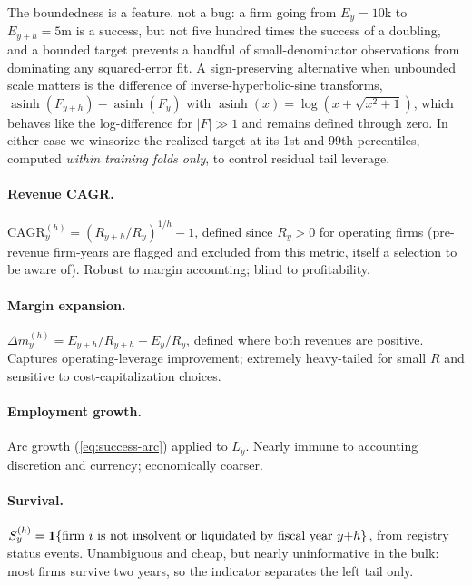 The boundedness is a feature, not a bug: a firm going from $E_y = 10$k to
$E_{y+h} = 5$m is a success, but not five hundred times the success of a doubling, and a
bounded target prevents a handful of small-denominator observations from dominating any
squared-error fit. A sign-preserving alternative when unbounded scale matters is the
difference of inverse-hyperbolic-sine transforms,
$\operatorname{asinh}(F_{y+h}) - \operatorname{asinh}(F_y)$ with
$\operatorname{asinh}(x) = \log(x + \sqrt{x^2+1})$, which behaves like the log-difference
for $|F| \gg 1$ and remains defined through zero. In either case we winsorize the
realized target at its 1st and 99th percentiles, computed \emph{within training folds
only}, to control residual tail leverage.

\paragraph{Revenue CAGR.} $\mathrm{CAGR}^{(h)}_y = (R_{y+h}/R_y)^{1/h} - 1$, defined
since $R_y > 0$ for operating firms (pre-revenue firm-years are flagged and excluded
from this metric, itself a selection to be aware of). Robust to margin accounting;
blind to profitability.

\paragraph{Margin expansion.} $\Delta m^{(h)}_y = E_{y+h}/R_{y+h} - E_y/R_y$, defined
where both revenues are positive. Captures operating-leverage improvement; extremely
heavy-tailed for small $R$ and sensitive to cost-capitalization choices.

\paragraph{Employment growth.} Arc growth (\ref{eq:success-arc}) applied to $L_y$.
Nearly immune to accounting discretion and currency; economically coarser.

\paragraph{Survival.} $S^{(h)}_y = \mathbf{1}\{\text{firm}~i~\text{is not insolvent or
liquidated by fiscal year}~y{+}h\}$, from registry status events. Unambiguous and
cheap, but nearly uninformative in the bulk: most firms survive two years, so the
indicator separates the left tail only.

